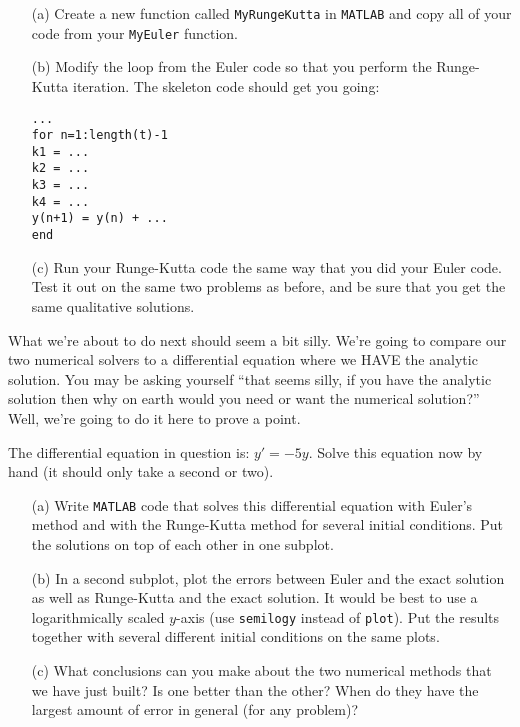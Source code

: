 \begin{problem}
    \begin{enumerate}
        \item[(a)] Create a new function called \texttt{MyRungeKutta} in \texttt{MATLAB} and copy
            all of your code from your \texttt{MyEuler} function.
        \item[(b)] Modify the loop from the Euler code so that you perform the Runge-Kutta
            iteration.  The skeleton code should get you going:
\begin{lstlisting}
...
for n=1:length(t)-1
k1 = ...
k2 = ...
k3 = ...
k4 = ...
y(n+1) = y(n) + ...
end
\end{lstlisting}
        \item[(c)] Run your Runge-Kutta code the same way that you did your Euler code.  Test it
            out on the same two problems as before, and be sure that you get the same
            qualitative solutions.
    \end{enumerate}
\end{problem}


What we're about to do next should seem a bit silly.  We're going to compare our two
numerical solvers to a differential equation where we HAVE the analytic solution.  You may
be asking yourself ``that seems silly, if you have the analytic solution then why on earth
would you need or want the numerical solution?''  Well, we're going to do it here to prove
a point.  

\begin{problem}
The differential equation in question is: $y' = -5y$.  Solve this equation now by hand (it
should only take a second or two).
\begin{enumerate}
    \item[(a)] Write \texttt{MATLAB} code that solves this differential equation with Euler's
        method and with the Runge-Kutta method for several initial conditions.  Put the
        solutions on top of each other in one subplot.
    \item[(b)] In a second subplot, plot the errors between Euler and the exact solution as
        well as Runge-Kutta and the exact solution.  It would be best to use a
        logarithmically scaled $y$-axis (use \texttt{semilogy} instead of \texttt{plot}).
        Put the results together with several different initial conditions on the same
        plots.
    \item[(c)] What conclusions can you make about the two numerical methods that we have just
        built?  Is one better than the other?  When do they have the largest amount of
        error in general (for any problem)?
\end{enumerate}
\end{problem}

